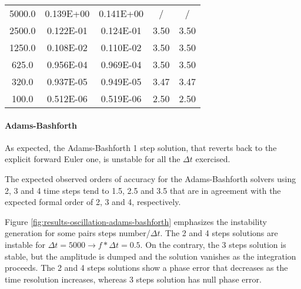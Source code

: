 \documentclass[pdftex,preprint,3p,times,numbers]{elsarticle}
\begin{document}
\begin{table}[!ht]
\begin{subtable}[b]{0.45\textwidth}
{\begin{tabular}{ccccc}
      \hline
      5000.0          &  0.139E+00    &  0.141E+00    & /             & /             \\
      2500.0          &  0.122E-01    &  0.124E-01    & 3.50          & 3.50          \\
      1250.0          &  0.108E-02    &  0.110E-02    & 3.50          & 3.50          \\
       625.0          &  0.956E-04    &  0.969E-04    & 3.50          & 3.50          \\
       320.0          &  0.937E-05    &  0.949E-05    & 3.47          & 3.47          \\
       100.0          &  0.512E-06    &  0.519E-06    & 2.50          & 2.50          \\
      \bottomrule
    \end{tabular}}
  \end{subtable}
\end{table}

\paragraph{Adams-Bashforth}

As expected, the Adams-Bashforth 1 step solution, that reverts back to the explicit forward Euler one, is unstable for all the $\Delta t$ exercised.

The expected observed orders of accuracy for the Adams-Bashforth solvers using 2, 3 and 4 time steps tend to 1.5, 2.5 and 3.5 that are in agreement with the expected formal order of 2, 3 and 4, respectively.

Figure \ref{fig:results-oscillation-adams-bashforth} emphasizes the instability generation for some pairs steps number/$\Delta t$. The 2 and 4 steps solutions are instable for $\Delta t=5000 \rightarrow f*\Delta t=0.5$. On the contrary, the 3 steps solution is stable, but the amplitude is dumped and the solution vanishes as the integration proceeds. The 2 and 4 steps solutions show a phase error that decreases as the time resolution increases, whereas 3 steps solution has null phase error.
\end{document}
